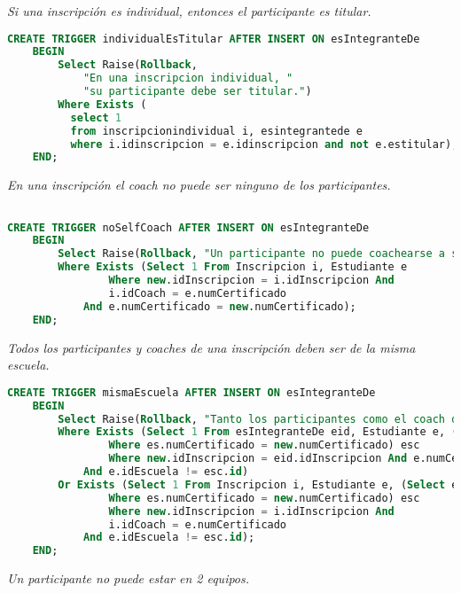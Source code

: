 \emph{Si una inscripción es individual, entonces el participante es titular.}

\begin{lstlisting}[language=SQL]
CREATE TRIGGER individualEsTitular AFTER INSERT ON esIntegranteDe
    BEGIN
        Select Raise(Rollback,
            "En una inscripcion individual, "
            "su participante debe ser titular.")
        Where Exists (
          select 1
          from inscripcionindividual i, esintegrantede e
          where i.idinscripcion = e.idinscripcion and not e.estitular);
    END;
\end{lstlisting}

\emph{En una inscripción el coach no puede ser ninguno de los participantes.}

\begin{lstlisting}[language=SQL]

CREATE TRIGGER noSelfCoach AFTER INSERT ON esIntegranteDe
    BEGIN
        Select Raise(Rollback, "Un participante no puede coachearse a sí mismo.")
        Where Exists (Select 1 From Inscripcion i, Estudiante e
                Where new.idInscripcion = i.idInscripcion And 
                i.idCoach = e.numCertificado
            And e.numCertificado = new.numCertificado);
    END;
\end{lstlisting}
  
\emph{Todos los participantes y coaches de una inscripción deben ser de la misma escuela.}

\begin{lstlisting}[language=SQL]
CREATE TRIGGER mismaEscuela AFTER INSERT ON esIntegranteDe
    BEGIN
        Select Raise(Rollback, "Tanto los participantes como el coach deben ser de la misma escuela.")
        Where Exists (Select 1 From esIntegranteDe eid, Estudiante e, (Select es.idEscuela id From Estudiante es
                Where es.numCertificado = new.numCertificado) esc
                Where new.idInscripcion = eid.idInscripcion And e.numCertificado = eid.numCertificado
            And e.idEscuela != esc.id)
        Or Exists (Select 1 From Inscripcion i, Estudiante e, (Select es.idEscuela id From Estudiante es
                Where es.numCertificado = new.numCertificado) esc
                Where new.idInscripcion = i.idInscripcion And 
                i.idCoach = e.numCertificado
            And e.idEscuela != esc.id);
    END;
\end{lstlisting}

\emph{Un participante no puede estar en 2 equipos.}

